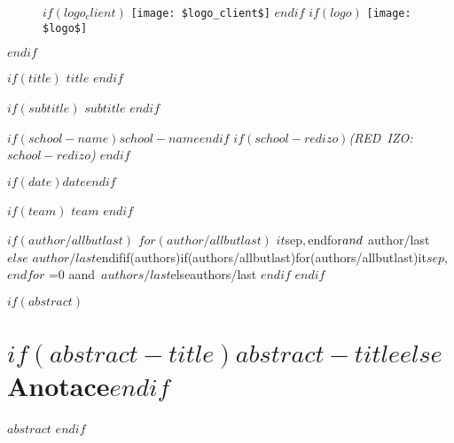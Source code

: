 \documentclass[12pt,a4paper,$for(classoption)$$classoption$$sep$,$endfor$]{$documentclass$}
\newcommand{\tr}[2]{\ifnum\pdfstrcmp{\languagename}{czech}=0 #1\else #2\fi}
\begin{document}
\begin{titlepage}
    \begin{center}

      \singlespacing

      \vspace*{1cm}

      \begin{figure}
      \centering
      $if(logo_client)$
      \texttt{[image: \$logo\_client\$]}%
      \hspace{1.5cm}%
      $endif$
      $if(logo)$
      \texttt{[image: \$logo\$]}%
      \end{figure}
      $endif$

      \vspace{1cm}

      $if(title)$
        \Huge{\textbf{$title$}}
      $endif$

      \LARGE

      $if(subtitle)$
        \vspace{.25cm}
        $subtitle$
      $endif$

      \vspace{2cm}

      \textit{$if(school-name)$$school-name$$endif$}
      \textit{$if(school-redizo)$(RED~IZO:~$school-redizo$) $endif$}

      \vspace{2cm}

      \Large

      $if(date)$$date$$endif$

      \vspace{.25cm}

      $if(team)$
	      $team$
	      \vspace{.25cm}
	    $endif$

      $if(author/allbutlast)$
      $for(author/allbutlast)$
      ${it}$sep$,
      $endfor$
      \tr{a}{and}~${author/last}
	  $else$
      ${author/last}
      $endif$

      $if(authors)$
      $if(authors/allbutlast)$
      $for(authors/allbutlast)$
      ${it}$sep$,
      $endfor$
      \tr{a}{and}~${authors/last}
	  $else$
      ${authors/last}
      $endif$
      $endif$

    \end{center}
\end{titlepage}

\onehalfspacing

$if(abstract)$
\thispagestyle{empty}
\chapter*{$if(abstract-title)$$abstract-title$$else$Anotace$endif$}
$abstract$
$endif$
\end{document}
